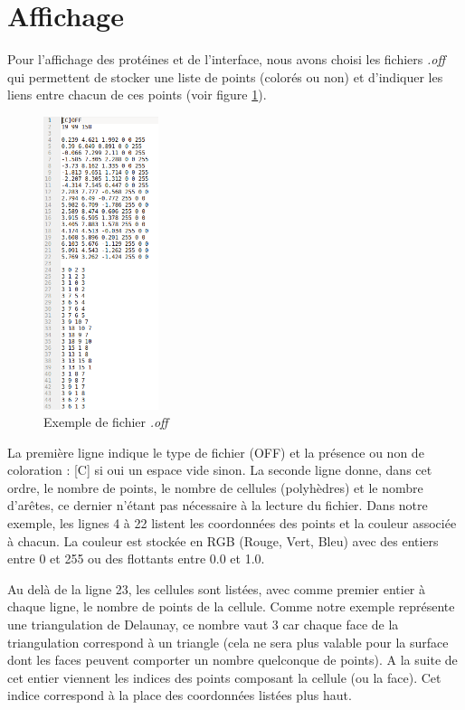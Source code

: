 \section{Affichage}

Pour l'affichage des protéines et de l'interface, nous avons choisi les fichiers
\textit{.off} qui permettent de stocker une liste de points (colorés ou non) et
d'indiquer les liens entre chacun de ces points (voir figure \ref{fig::off_file}).

\begin{figure}[ht]
\centering
  \includegraphics[width=0.3\textwidth]{figures/off_file.png}
  \caption{Exemple de fichier \textit{.off}}
  \label{fig::off_file}
\end{figure}

La première ligne indique le type de fichier (OFF) et la présence ou non de coloration :
[C] si oui un espace vide sinon. La seconde ligne donne, dans cet ordre, le nombre
de points, le nombre de cellules (polyhèdres) et le nombre d'arêtes, ce dernier n'étant
pas nécessaire à la lecture du fichier. Dans notre exemple, les lignes 4 à 22 listent
les coordonnées des points et la couleur associée à chacun. La couleur est stockée en RGB
(Rouge, Vert, Bleu) avec des entiers entre 0 et 255 ou des flottants entre 0.0 et 1.0.

Au delà de la ligne 23, les cellules sont listées, avec comme premier entier à chaque
ligne, le nombre de points de la cellule. Comme notre exemple représente une triangulation
de Delaunay, ce nombre vaut 3 car chaque face de la triangulation correspond à un
triangle (cela ne sera plus valable pour la surface dont les faces peuvent comporter un nombre
quelconque de points). A la suite de cet entier viennent les indices des points composant la cellule
(ou la face). Cet indice correspond à la place des coordonnées listées plus haut.


